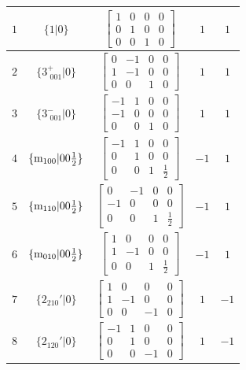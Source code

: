 \documentclass[fleqn,8pt]{jsarticle}
\begin{document}
\begin{longtable}{ccccc}
$ 1 $ & $ \{1|0\} $ & $ \begin{bmatrix} 1 & 0 & 0 & 0 \\ 0 & 1 & 0 & 0 \\ 0 & 0 & 1 & 0 \end{bmatrix} $ & $ 1 $ & $ 1 $ \\ \hline
$ 2 $ & $ \{3^{+}_{\,\,001}|0\} $ & $ \begin{bmatrix} 0 & -1 & 0 & 0 \\ 1 & -1 & 0 & 0 \\ 0 & 0 & 1 & 0 \end{bmatrix} $ & $ 1 $ & $ 1 $ \\ \hline
$ 3 $ & $ \{3^{-}_{\,\,001}|0\} $ & $ \begin{bmatrix} -1 & 1 & 0 & 0 \\ -1 & 0 & 0 & 0 \\ 0 & 0 & 1 & 0 \end{bmatrix} $ & $ 1 $ & $ 1 $ \\ \hline
$ 4 $ & $ \{{\rm m}_{100}|0 0 \frac{1}{2}\} $ & $ \begin{bmatrix} -1 & 1 & 0 & 0 \\ 0 & 1 & 0 & 0 \\ 0 & 0 & 1 & \frac{1}{2} \end{bmatrix} $ & $ -1 $ & $ 1 $ \\ \hline
$ 5 $ & $ \{{\rm m}_{110}|0 0 \frac{1}{2}\} $ & $ \begin{bmatrix} 0 & -1 & 0 & 0 \\ -1 & 0 & 0 & 0 \\ 0 & 0 & 1 & \frac{1}{2} \end{bmatrix} $ & $ -1 $ & $ 1 $ \\ \hline
$ 6 $ & $ \{{\rm m}_{010}|0 0 \frac{1}{2}\} $ & $ \begin{bmatrix} 1 & 0 & 0 & 0 \\ 1 & -1 & 0 & 0 \\ 0 & 0 & 1 & \frac{1}{2} \end{bmatrix} $ & $ -1 $ & $ 1 $ \\ \hline
$ 7 $ & $ \{2{}_{210}{}'|0\} $ & $ \begin{bmatrix} 1 & 0 & 0 & 0 \\ 1 & -1 & 0 & 0 \\ 0 & 0 & -1 & 0 \end{bmatrix} $ & $ 1 $ & $ -1 $ \\ \hline
$ 8 $ & $ \{2{}_{120}{}'|0\} $ & $ \begin{bmatrix} -1 & 1 & 0 & 0 \\ 0 & 1 & 0 & 0 \\ 0 & 0 & -1 & 0 \end{bmatrix} $ & $ 1 $ & $ -1 $ \\ \hline

\end{longtable}
\end{document}
